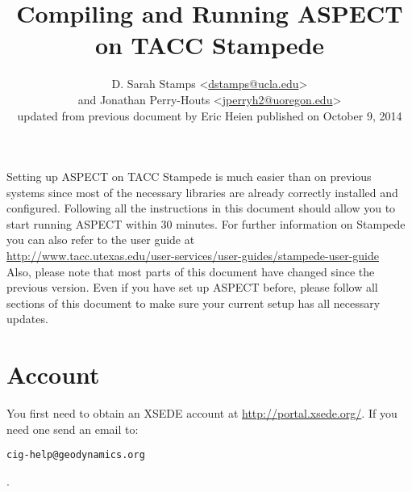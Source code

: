 \documentclass[12pt]{article}
\begin{document}
\title{Compiling and Running ASPECT on TACC Stampede}
\author{D. Sarah Stamps \textless\href{dstamps@ucla.edu}{dstamps@ucla.edu}\textgreater \\
and Jonathan Perry-Houts \textless\href{jperryh2@uoregon.edu}{jperryh2@uoregon.edu}\textgreater\\
updated from previous document by Eric Heien published on October 9, 2014}

\maketitle



\noindent Setting up ASPECT on TACC Stampede is much easier than on previous systems since
most of the necessary libraries are already correctly installed and configured. Following all
the instructions in this document should allow you to start running ASPECT within 30
minutes. For further information on Stampede you can also refer to the user guide at \\\url{http://www.tacc.utexas.edu/user-services/user-guides/stampede-user-guide} \\

\noindent Also, please note that most parts of this document have changed since the previous
version. Even if you have set up ASPECT before, please follow all sections of this document
to make sure your current setup has all necessary updates.


\section{Account}
You first need to obtain an XSEDE account at \url{http://portal.xsede.org/}. If you need one send an email to: \begin{alltt}\footnotesize cig-help@geodynamics.org\end{alltt}.  
\end{document}
